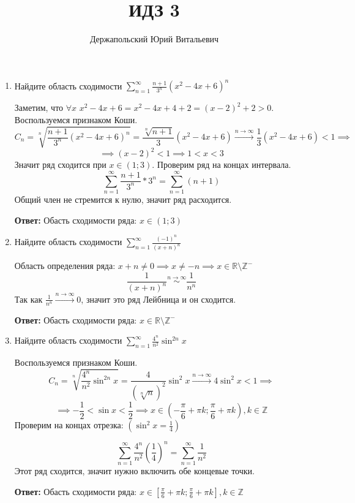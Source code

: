 \documentclass[10pt]{article} %
\title{ИДЗ 3}
\author{Держапольский Юрий Витальевич}
\date{} %
\begin{document}
 \begin{large}  
\maketitle


\begin{enumerate}
\item Найдите область сходимости $ \sum\limits_{n=1}^{\infty}\frac{n+1}{3^n}(x^2-4x+6)^n $

Заметим, что $\forall  x \,\, x^2-4x+6 = x^2-4x+4+2 = (x-2)^2 + 2 > 0 $. Воспользуемся признаком Коши.
\[ C_{n} = \sqrt[n]{\frac{n+1}{3^n}(x^2-4x+6)^n  } = \frac{\sqrt[n]{n+1}}{3}(x^2-4x+6) \xrightarrow{n\to\infty} \frac{1}{3}(x^2-4x+6) < 1 \implies \]
\[ \implies (x-2)^2 < 1 \implies 1< x < 3 \]
Значит ряд сходится при $ x \in (1;3) $. Проверим ряд на концах интервала.
\[  \sum_{n=1}^{\infty}\frac{n+1}{3^n} * 3^n = \sum_{n=1}^{\infty}(n+1) \]
Общий член не стремится к нулю, значит ряд расходится.

\textbf{Ответ:} Обасть сходимости ряда: $ x \in (1;3) $

\item Найдите область сходимости $ \sum\limits_{n=1}^{\infty}\frac{(-1)^n}{(x+n)^n} $

Область определения ряда: $ x + n \neq 0 \implies x \neq -n \implies x \in \mathbb{R} \setminus \mathbb{Z}^{-}   $
\[ \frac{1}{(x+n)^n} \stackrel{n\to\infty}{\sim} \frac{1}{n^n} \]
Так как $ \frac{1}{n^n} \xrightarrow{n\to\infty} 0 $, значит это ряд Лейбница и он сходится.

\textbf{Ответ:} Обасть сходимости ряда: $ x \in \mathbb{R} \setminus \mathbb{Z}^{-} $

\item Найдите область сходимости $ \sum\limits_{n=1}^{\infty}\frac{4^n}{n^2}\sin^{2n}x $

Воспользуемся признаком Коши.
\[ C_{n} = \sqrt[n]{\frac{4^n}{n^2}\sin^{2n}x} = \frac{4}{(\sqrt[n]{n})^2} \sin^{2}x \xrightarrow{n\to\infty} 4 \sin^{2}x < 1 \implies \]
\[ \implies -\frac{1}{2} < \sin x < \frac{1}{2} \implies x \in (-\frac{\pi}{6} + \pi k; \frac{\pi}{6} + \pi k), k \in \mathbb{Z} \]
Проверим на концах отрезка: $(\sin^2 x = \frac{1}{4})$

\[ \sum_{n=1}^{\infty}\frac{4^n}{n^2} \left( \frac{1}{4}\right)^n = \sum_{n=1}^{\infty}\frac{1}{n^2} \]
Этот ряд сходится, значит нужно включить обе концевые точки.

\textbf{Ответ:} Обасть сходимости ряда: $ x \in [\frac{\pi}{6} + \pi k; \frac{\pi}{6} + \pi k], k \in \mathbb{Z} $


\end{enumerate}
\end{large}
\end{document}
